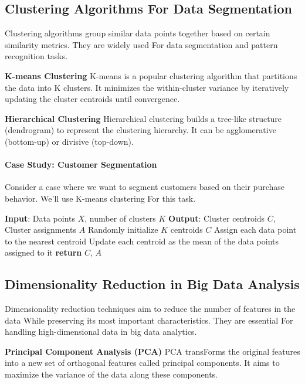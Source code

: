 \documentclass[12pt]{book} %
\begin{document}
\subsection{Clustering Algorithms For Data Segmentation}

Clustering algorithms group similar data points together based on certain similarity metrics. They are widely used For data segmentation and pattern recognition tasks.

\textbf{K-means Clustering}
K-means is a popular clustering algorithm that partitions the data into K clusters. It minimizes the within-cluster variance by iteratively updating the cluster centroids until convergence.

\textbf{Hierarchical Clustering}
Hierarchical clustering builds a tree-like structure (dendrogram) to represent the clustering hierarchy. It can be agglomerative (bottom-up) or divisive (top-down).

\paragraph{Case Study: Customer Segmentation}
Consider a case where we want to segment customers based on their purchase behavior. We'll use K-means clustering For this task.
\FloatBarrier
\begin{algorithm}[H]
\caption{K-means Clustering}\label{alg:kmeans}
\begin{algorithmic}[1]
\State \textbf{Input}: Data points $X$, number of clusters $K$
\State \textbf{Output}: Cluster centroids $C$, Cluster assignments $A$
\State Randomly initialize $K$ centroids $C$
\Repeat
    \State Assign each data point to the nearest centroid
    \State Update each centroid as the mean of the data points assigned to it
\State \textbf{return} $C$, $A$
\end{algorithmic}
\end{algorithm}
\FloatBarrier

\subsection{Dimensionality Reduction in Big Data Analysis}

Dimensionality reduction techniques aim to reduce the number of features in the data While preserving its most important characteristics. They are essential For handling high-dimensional data in big data analytics.

\textbf{Principal Component Analysis (PCA)}
PCA transForms the original features into a new set of orthogonal features called principal components. It aims to maximize the variance of the data along these components.
\end{document}
